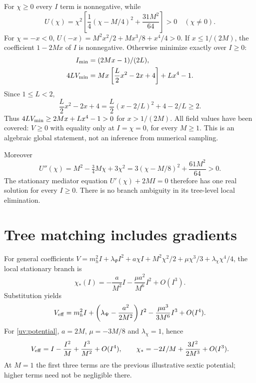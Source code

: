 \documentclass[11pt]{article}
\begin{document}
For $\chi\ge0$ every $I$ term is nonnegative, while
\begin{equation}
 U(\chi)=\chi^2\left[\frac14(\chi-M/4)^2+\frac{31M^2}{64}\right]>0
 \quad(\chi\ne0).
\end{equation}
For $\chi=-x<0$, $U(-x)=M^2x^2/2+Mx^3/8+x^4/4>0$. If
$x\le1/(2M)$, the coefficient $1-2Mx$ of $I$ is nonnegative.
Otherwise minimize exactly over $I\ge0$:
\begin{align}
 I_{\rm min}&=(2Mx-1)/(2L),\\
 4L V_{\rm min}&=Mx\left[\frac L2x^2-2x+4\right]+Lx^4-1.
\end{align}
Since $1\le L<2$,
\begin{equation}
 \frac L2x^2-2x+4=\frac L2(x-2/L)^2+4-2/L\ge2.
\end{equation}
Thus $4LV_{\rm min}\ge2Mx+Lx^4-1>0$ for $x>1/(2M)$.
All field values have been covered: $V\ge0$ with equality only at
$I=\chi=0$, for every $M\ge1$. This is an algebraic global statement,
not an inference from numerical sampling.

Moreover
\begin{equation}
 U''(\chi)=M^2-\tfrac34M\chi+3\chi^2
 =3(\chi-M/8)^2+\frac{61M^2}{64}>0.
\end{equation}
The stationary mediator equation
$U'(\chi)+2MI=0$ therefore has one real solution for every $I\ge0$.
There is no branch ambiguity in its tree-level local elimination.

\section{Tree matching includes gradients}
For general coefficients
$V=m_h^2 I+\lambda_\Psi I^2+a\chi I+M^2\chi^2/2+
\mu\chi^3/3+\lambda_\chi\chi^4/4$, the local stationary branch is
\begin{equation}
 \chi_*(I)=-\frac a{M^2}I-\frac{\mu a^2}{M^6}I^2+O(I^3).
\end{equation}
Substitution yields
\begin{equation}
 V_{\rm eff}=m_h^2 I+
 \left(\lambda_\Psi-\frac{a^2}{2M^2}\right)I^2
 -\frac{\mu a^3}{3M^6}I^3+O(I^4).
\end{equation}
For \eqref{uv:potential}, $a=2M$, $\mu=-3M/8$ and
$\lambda_\chi=1$, hence
\begin{equation}
 V_{\rm eff}=I-\frac{I^2}{M}+\frac{I^3}{M^2}+O(I^4),
 \qquad \chi_*=-2I/M+\frac{3I^2}{2M^3}+O(I^3).
 \label{uv:sextic}
\end{equation}
At $M=1$ the first three terms are the previous illustrative sextic
potential; higher terms need not be negligible there.
\end{document}
